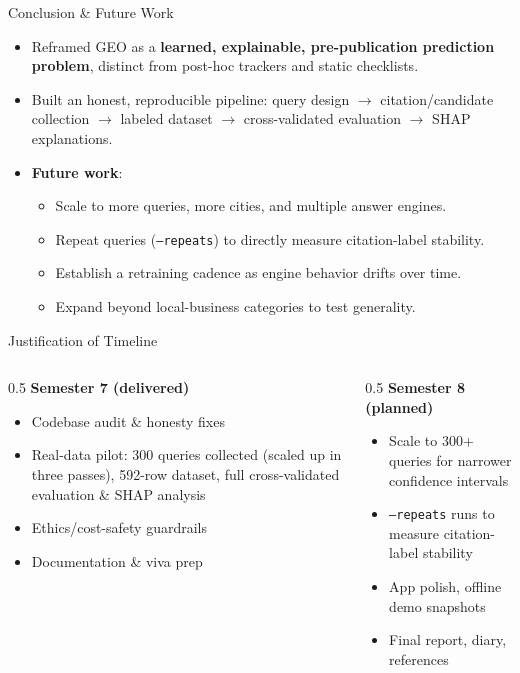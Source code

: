 \documentclass[aspectratio=169]{beamer}
\begin{document}
\begin{frame}{Conclusion \& Future Work}
  \begin{itemize}
    \item Reframed GEO as a \textbf{learned, explainable, pre-publication prediction problem}, distinct from post-hoc trackers and static checklists.
    \item Built an honest, reproducible pipeline: query design $\to$ citation/candidate collection $\to$ labeled dataset $\to$ cross-validated evaluation $\to$ SHAP explanations.
    \item \textbf{Future work}:
    \begin{itemize}
      \item Scale to more queries, more cities, and multiple answer engines.
      \item Repeat queries (\texttt{--repeats}) to directly measure citation-label stability.
      \item Establish a retraining cadence as engine behavior drifts over time.
      \item Expand beyond local-business categories to test generality.
    \end{itemize}
  \end{itemize}
\end{frame}

\begin{frame}{Justification of Timeline}
  \begin{columns}[T]
    \begin{column}{0.5\textwidth}
      \textbf{Semester 7 (delivered)}
      \begin{itemize}
        \item Codebase audit \& honesty fixes
        \item Real-data pilot: 300 queries collected (scaled up in three passes), 592-row dataset, full cross-validated evaluation \& SHAP analysis
        \item Ethics/cost-safety guardrails
        \item Documentation \& viva prep
      \end{itemize}
    \end{column}
    \begin{column}{0.5\textwidth}
      \textbf{Semester 8 (planned)}
      \begin{itemize}
        \item Scale to 300+ queries for narrower confidence intervals
        \item \texttt{--repeats} runs to measure citation-label stability
        \item App polish, offline demo snapshots
        \item Final report, diary, references
      \end{itemize}
    \end{column}
  \end{columns}
\end{frame}
\end{document}
